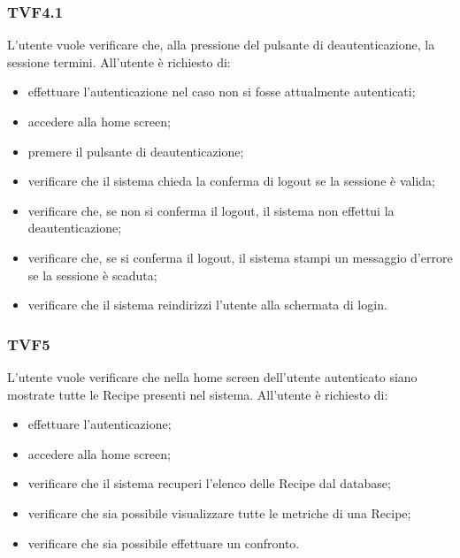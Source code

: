 		\subsubsection{TVF4.1}
			L'utente vuole verificare che, alla pressione del pulsante di deautenticazione, la sessione termini. All'utente è richiesto di:
			\begin{itemize}
				\item effettuare l'autenticazione nel caso non si fosse attualmente autenticati;
				\item accedere alla home screen;
				\item premere il pulsante di deautenticazione;
				\item verificare che il sistema chieda la conferma di logout se la sessione è valida;
				\item verificare che, se non si conferma il logout, il sistema non effettui la deautenticazione;
				\item verificare che, se si conferma il logout, il sistema stampi un messaggio d'errore se la sessione è scaduta;
				\item verificare che il sistema reindirizzi l'utente alla schermata di login.
			\end{itemize}
			
		\subsubsection{TVF5}
			L'utente vuole verificare che nella home screen dell'utente autenticato siano mostrate tutte le Recipe presenti nel sistema. All'utente è richiesto di:
			\begin{itemize}
				\item effettuare l'autenticazione;
				\item accedere alla home screen;
				\item verificare che il sistema recuperi l'elenco delle Recipe dal database;
				\item verificare che sia possibile visualizzare tutte le metriche di una Recipe;
				\item verificare che sia possibile effettuare un confronto.
			\end{itemize}
			
